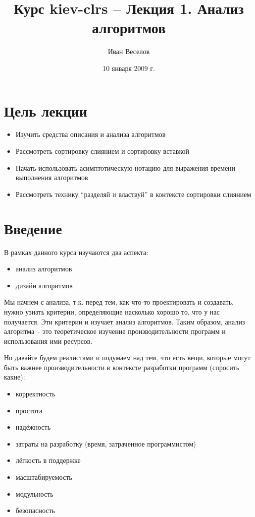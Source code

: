\documentclass[11pt]{article}
\author{Иван Веселов}
\title{Курс kiev-clrs -- Лекция 1. Анализ алгоритмов}
\date{10 января 2009 г.}
\begin{document}
\maketitle
\tableofcontents
\newpage

\setlength{\parskip}{1ex plus 0.5ex minus 0.2ex}

\section{Цель лекции}
\begin{itemize}
\item Изучить средства описания и анализа алгоритмов
\item Рассмотреть сортировку слиянием и сортировку вставкой
\item Начать использовать асимптотическую нотацию для выражения времени
  выполнения алгоритмов
\item Рассмотреть технику ``разделяй и властвуй'' в контексте сортировки
  слиянием
\end{itemize}

\section{Введение}
В рамках данного курса изучаются два аспекта:
\begin{itemize}
  \item анализ алгоритмов
  \item дизайн алгоритмов
\end{itemize}

Мы начнём с анализа, т.к. перед тем, как что-то проектировать и создавать, нужно
узнать критерии, определяющие насколько хорошо то, что у нас получается. Эти
критерии и изучает анализ алгоритмов. Таким образом, анализ алгоритма -- это
теоретическое изучение производительности программ и использования ими ресурсов.

Но давайте будем реалистами и подумаем над тем, что есть вещи, которые могут
быть важнее производительности в контексте разработки программ (спросить какие):

\begin{itemize}
\item корректность
\item простота
\item надёжность
\item затраты на разработку (время, затраченное программистом)
\item лёгкость в поддержке
\item масштабируемость
\item модульность
\item безопасность
\end{itemize}
\end{document}

